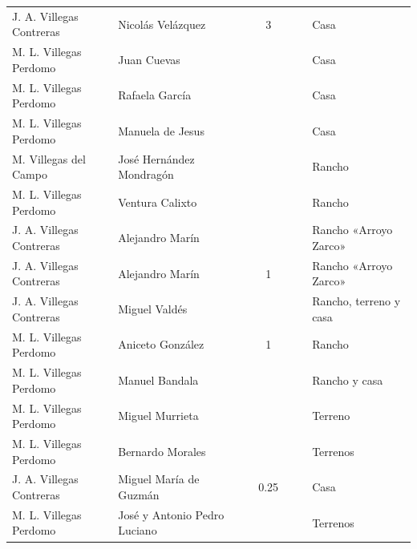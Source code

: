 \documentclass[14pt,twoside,final]{extbook} %
\begin{document}
{\begin{longtable}[c]{@{}p{2.5cm}lrSrrl@{}}
J. A. Villegas Contreras & Nicolás Velázquez &  & 3 &  &  & Casa \\
M. L. Villegas Perdomo & Juan Cuevas &  & {} & {} & {} & Casa \\
M. L. Villegas Perdomo & Rafaela García &  & {} & {} & {} & Casa \\
M. L. Villegas Perdomo & Manuela de Jesus &  & {} & {} & {} & Casa \\
M. Villegas del Campo & José Hernández Mondragón &  & {} & {} & {} & Rancho \\
M. L. Villegas Perdomo & Ventura Calixto &  & {} & {} & {} & Rancho \\
J. A. Villegas Contreras & Alejandro Marín &  & {} &  &  & Rancho «Arroyo Zarco» \\
J. A. Villegas Contreras & Alejandro Marín &  & 1 &  &  & Rancho «Arroyo Zarco» \\
J. A. Villegas Contreras & Miguel Valdés &  & {} &  &  & Rancho, terreno y casa \\
M. L. Villegas Perdomo & Aniceto González &  & 1 & {} & {} & Rancho \\
M. L. Villegas Perdomo & Manuel Bandala &  & {} & {} & {} & Rancho y casa \\
M. L. Villegas Perdomo & Miguel Murrieta &  & {} & {} & {} & Terreno \\
M. L. Villegas Perdomo & Bernardo Morales &  & {} & {} & {} & Terrenos \\
J. A. Villegas Contreras & Miguel María de Guzmán &  & 0.25 &  &  & Casa \\
M. L. Villegas Perdomo & José y Antonio Pedro Luciano &  & {} & {} & {} & Terrenos \\

\end{longtable}}
\end{document}

